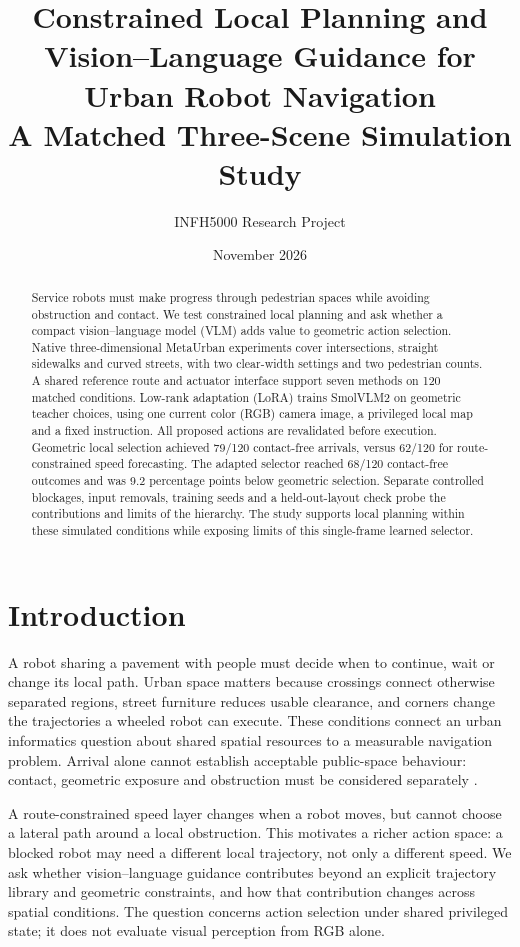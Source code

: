 \documentclass[10pt,a4paper]{article}
\title{Constrained Local Planning and Vision--Language Guidance for Urban Robot Navigation\\\large A Matched Three-Scene Simulation Study}
\author{INFH5000 Research Project}
\date{November 2026}
\begin{document}
\maketitle
\begin{abstract}
Service robots must make progress through pedestrian spaces while avoiding obstruction and contact. We test constrained local planning and ask whether a compact vision--language model (VLM) adds value to geometric action selection. Native three-dimensional MetaUrban experiments cover intersections, straight sidewalks and curved streets, with two clear-width settings and two pedestrian counts. A shared reference route and actuator interface support seven methods on 120 matched conditions. Low-rank adaptation (LoRA) trains SmolVLM2 on geometric teacher choices, using one current color (RGB) camera image, a privileged local map and a fixed instruction. All proposed actions are revalidated before execution. Geometric local selection achieved 79/120 contact-free arrivals, versus 62/120 for route-constrained speed forecasting. The adapted selector reached 68/120 contact-free outcomes and was 9.2 percentage points below geometric selection.  Separate controlled blockages, input removals, training seeds and a held-out-layout check probe the contributions and limits of the hierarchy. The study supports local planning within these simulated conditions while exposing limits of this single-frame learned selector.
\end{abstract}

\section{Introduction}
A robot sharing a pavement with people must decide when to continue, wait or change its local path. Urban space matters because crossings connect otherwise separated regions, street furniture reduces usable clearance, and corners change the trajectories a wheeled robot can execute. These conditions connect an urban informatics question about shared spatial resources to a measurable navigation problem. Arrival alone cannot establish acceptable public-space behaviour: contact, geometric exposure and obstruction must be considered separately \cite{francis}.

A route-constrained speed layer changes when a robot moves, but cannot choose a lateral path around a local obstruction. This motivates a richer action space: a blocked robot may need a different local trajectory, not only a different speed. We ask whether vision--language guidance contributes beyond an explicit trajectory library and geometric constraints, and how that contribution changes across spatial conditions. The question concerns action selection under shared privileged state; it does not evaluate visual perception from RGB alone.
\end{document}
